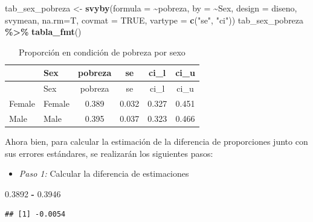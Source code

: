 \documentclass[
  spanish,
  12pt,
]{book}
\newenvironment{Shaded}{\begin{snugshade}}{\end{snugshade}}
\newcommand{\AttributeTok}[1]{\textcolor[rgb]{0.13,0.29,0.53}{#1}}
\newcommand{\ConstantTok}[1]{\textcolor[rgb]{0.56,0.35,0.01}{#1}}
\newcommand{\FloatTok}[1]{\textcolor[rgb]{0.00,0.00,0.81}{#1}}
\newcommand{\FunctionTok}[1]{\textcolor[rgb]{0.13,0.29,0.53}{\textbf{#1}}}
\newcommand{\NormalTok}[1]{#1}
\newcommand{\OtherTok}[1]{\textcolor[rgb]{0.56,0.35,0.01}{#1}}
\newcommand{\SpecialCharTok}[1]{\textcolor[rgb]{0.81,0.36,0.00}{\textbf{#1}}}
\newcommand{\StringTok}[1]{\textcolor[rgb]{0.31,0.60,0.02}{#1}}
\providecommand{\tightlist}{%
  \setlength{\itemsep}{0pt}\setlength{\parskip}{0pt}}
\begin{document}
\begin{Shaded}
\begin{Highlighting}[]
\NormalTok{tab\_sex\_pobreza }\OtherTok{\textless{}{-}} \FunctionTok{svyby}\NormalTok{(}\AttributeTok{formula =} \SpecialCharTok{\textasciitilde{}}\NormalTok{pobreza, }\AttributeTok{by =} \SpecialCharTok{\textasciitilde{}}\NormalTok{Sex,}
                         \AttributeTok{design =}\NormalTok{ diseno, svymean, }\AttributeTok{na.rm=}\NormalTok{T,}
                         \AttributeTok{covmat =} \ConstantTok{TRUE}\NormalTok{, }\AttributeTok{vartype =} \FunctionTok{c}\NormalTok{(}\StringTok{"se"}\NormalTok{, }\StringTok{"ci"}\NormalTok{))}
\NormalTok{tab\_sex\_pobreza }\SpecialCharTok{\%\textgreater{}\%}
  \FunctionTok{tabla\_fmt}\NormalTok{()}
\end{Highlighting}
\end{Shaded}

\begin{longtable}[]{@{}llcccc@{}}
\caption{\label{tab:tab-svyby-pobreza-sexo2}Proporción en condición de pobreza por sexo}\tabularnewline
\toprule\noalign{}
& Sex & pobreza & se & ci\_l & ci\_u \\
\midrule\noalign{}
\endfirsthead
\toprule\noalign{}
& Sex & pobreza & se & ci\_l & ci\_u \\
\midrule\noalign{}
\endhead
\bottomrule\noalign{}
\endlastfoot
Female & Female & 0.389 & 0.032 & 0.327 & 0.451 \\
Male & Male & 0.395 & 0.037 & 0.323 & 0.466 \\
\end{longtable}

Ahora bien, para calcular la estimación de la diferencia de proporciones junto con sus errores estándares, se realizarán los siguientes pasos:

\begin{itemize}
\tightlist
\item
  \emph{Paso 1:} Calcular la diferencia de estimaciones
\end{itemize}

\begin{Shaded}
\begin{Highlighting}[]
\FloatTok{0.3892} \SpecialCharTok{{-}} \FloatTok{0.3946}          
\end{Highlighting}
\end{Shaded}

\begin{verbatim}
## [1] -0.0054
\end{verbatim}
\end{document}
